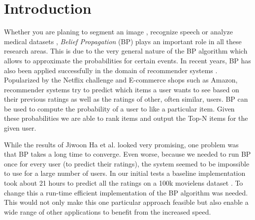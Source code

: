 
\section{Introduction}\label{sec:intro}

Whether you are planing to segment an image \cite{1544822}, recognize speech \cite{5373446} or analyze medical datasets \cite{bailly2011finding}, \textit{Belief Propagation} (BP) plays an important role in all these research areas. This is due to the very general nature of the BP algorithm which allows to approximate the probabilities for certain events. In recent years, BP has also been applied successfully in the domain of recommender systems \cite{Ha:2012:TRT:2396761.2398636}. Popularized by the Netflix challenge and E-commerce shops such as Amazon, recommender systems try to predict which items a user wants to see based on their previous ratings as well as the ratings of other, often similar, users. BP can be used to compute the probability of a user to like a particular item. Given these probabilities we are able to rank items and output the Top-N items for the given user.

 




While the results of Jiwoon Ha et al.\cite{Ha:2012:TRT:2396761.2398636} looked very promising, one problem was that BP takes a long time to converge. Even worse, because we needed to run BP once for every user (to predict their ratings), the system seemed to be impossible to use for a large number of users. In our initial tests a baseline implementation took about 21 hours to predict all the ratings on a 100k movielens dataset \cite{riedl1998movielens}. To change this a run-time efficient implementation of the BP algorithm was needed.
This would not only make this one particular approach feasible but also enable a wide range of other applications to benefit from the increased speed.


